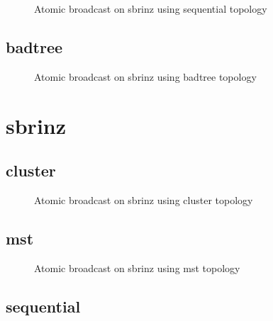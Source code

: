 \begin{figure}[ht!]

\caption{Atomic broadcast on sbrinz using sequential topology}
\label{fig:ab_sbrinz_sequential}
\end{figure}
\clearpage\subsection{badtree}

\begin{figure}[ht!]

\caption{Atomic broadcast on sbrinz using badtree topology}
\label{fig:ab_sbrinz_badtree}
\end{figure}
\clearpage\newpage\clearpage\section{sbrinz}

\subsection{cluster}

\begin{figure}[ht!]

\caption{Atomic broadcast on sbrinz using cluster topology}
\label{fig:ab_sbrinz_cluster}
\end{figure}
\clearpage\subsection{mst}

\begin{figure}[ht!]

\caption{Atomic broadcast on sbrinz using mst topology}
\label{fig:ab_sbrinz_mst}
\end{figure}
\clearpage\subsection{sequential}

